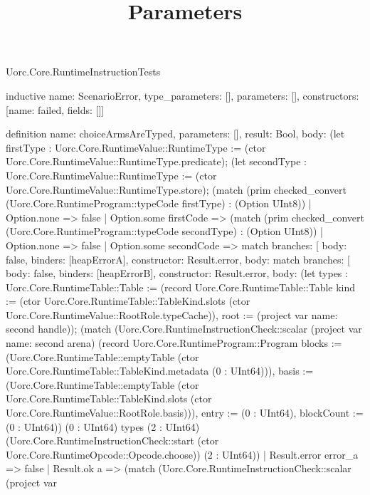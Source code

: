\begin{lexlean}{Uorc.Core.RuntimeInstructionTests}
\title{Parameters}
\begin{semanticmodule}
inductive{
  name: ScenarioError,
  type_parameters: [],
  parameters: [],
  constructors: [{name: failed, fields: []}]
}

definition{
  name: choiceArmsAreTyped,
  parameters: [],
  result: Bool,
  body: (let firstType : Uorc.Core.RuntimeValue::RuntimeType := (ctor Uorc.Core.RuntimeValue::RuntimeType.predicate); (let secondType : Uorc.Core.RuntimeValue::RuntimeType := (ctor Uorc.Core.RuntimeValue::RuntimeType.store); (match (prim checked_convert (Uorc.Core.RuntimeProgram::typeCode firstType) : (Option UInt8))
    | Option.none => false
    | Option.some firstCode => (match (prim checked_convert (Uorc.Core.RuntimeProgram::typeCode secondType) : (Option UInt8))
      | Option.none => false
      | Option.some secondCode => match{
        branches: [
          {body: false, binders: [heapErrorA], constructor: Result.error},
          {
            body: match{
              branches: [
                {body: false, binders: [heapErrorB], constructor: Result.error},
                {
                  body: (let types : Uorc.Core.RuntimeTable::Table := (record Uorc.Core.RuntimeTable::Table {kind := (ctor Uorc.Core.RuntimeTable::TableKind.slots (ctor Uorc.Core.RuntimeValue::RootRole.typeCache)), root := (project var{
                    name: second
                  } handle)}); (match (Uorc.Core.RuntimeInstructionCheck::scalar (project var{
                      name: second
                    } arena) (record Uorc.Core.RuntimeProgram::Program {blocks := (Uorc.Core.RuntimeTable::emptyTable (ctor Uorc.Core.RuntimeTable::TableKind.metadata (0 : UInt64))), basis := (Uorc.Core.RuntimeTable::emptyTable (ctor Uorc.Core.RuntimeTable::TableKind.slots (ctor Uorc.Core.RuntimeValue::RootRole.basis))), entry := (0 : UInt64), blockCount := (0 : UInt64)}) (0 : UInt64) types (2 : UInt64) (Uorc.Core.RuntimeInstructionCheck::start (ctor Uorc.Core.RuntimeOpcode::Opcode.choose)) (2 : UInt64))
                    | Result.error error_a => false
                    | Result.ok a => (match (Uorc.Core.RuntimeInstructionCheck::scalar (project var{
}}}}}}
\end{semanticmodule}
\end{lexlean}
